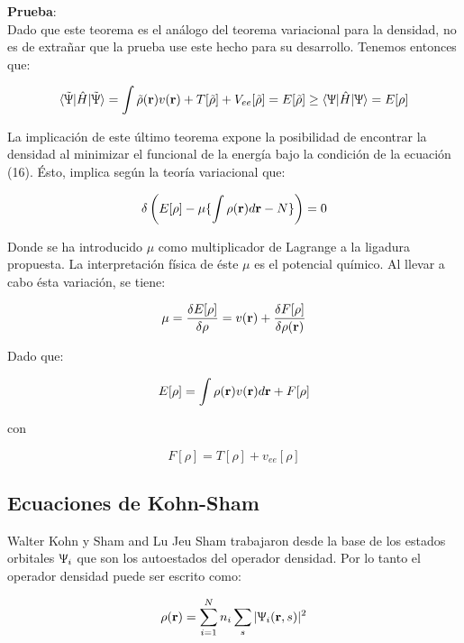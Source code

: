 \documentclass [11pt]{article}
\begin{document}
{\bf Prueba}:\\
Dado que este teorema es el análogo del teorema variacional para la densidad, no es de extrañar que la prueba use este hecho para su desarrollo. Tenemos entonces que:

\begin{eqnarray}
    \langle\tilde\Uppsi|\hat H|\tilde\Uppsi\rangle=\int \tilde\rho({\bf r})v({\bf r})+T[\tilde\rho]+V_{ee}[\tilde\rho]=E[\tilde\rho]\geq\langle\Uppsi|\hat H|\Uppsi\rangle=E[\rho]
\end{eqnarray}

La implicación de este último teorema expone la posibilidad de encontrar la densidad al minimizar el funcional de la energía bajo la condición de la ecuación (16). Ésto, implica según la teoría variacional que:

\begin{equation}
	\delta\left(E[\rho]-\mu\{\int \rho({\bf r})d{\bf r}-N\}\right)=0
\end{equation}	

Donde se ha introducido $\mu$ como multiplicador de Lagrange a la ligadura propuesta. La interpretación física de éste $\mu$ es el potencial químico. Al llevar a cabo ésta variación, se tiene:

\begin{equation}
	\mu=\frac{\delta E[\rho]}{\delta \rho}=v({\bf r})+\frac{\delta F[\rho]}{\delta\rho({\bf r})}
\end{equation}

Dado que:

\begin{equation}
	E[\rho]=\int \rho({\bf r})v({\bf r})d{\bf r}+F[\rho]
\end{equation}

con

\begin{equation}
	F[\rho]=T[\rho]+v_{ee}[\rho]
\end{equation}

\subsection{Ecuaciones de Kohn-Sham}

Walter Kohn y Sham and Lu Jeu Sham trabajaron desde la base de los estados orbitales $\Uppsi_i$  que son los autoestados del operador densidad. Por lo tanto el operador densidad puede ser escrito como:

\begin{equation}
    \rho ({\bf r})=\sum_{i=1}^Nn_i\sum_s^{}|\Uppsi_i({\bf r}, s)|^2
\end{equation}
\end{document}
